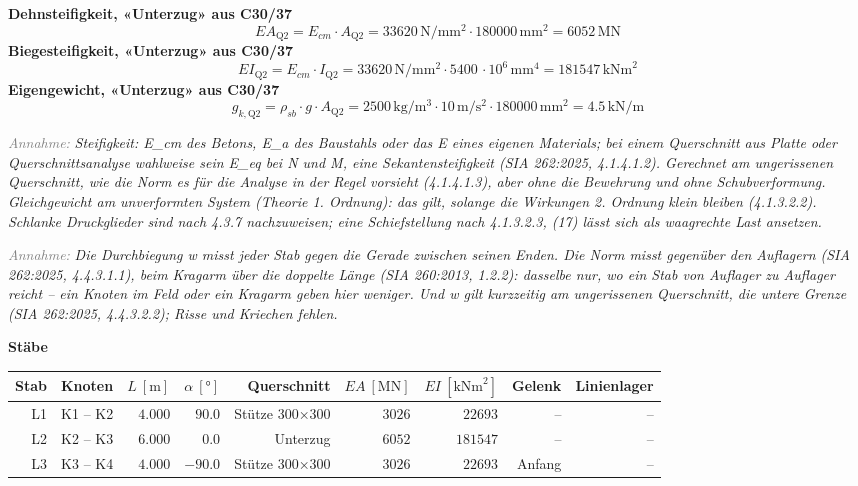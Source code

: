 \documentclass[11pt,a4paper]{article}
\newcommand{\hinweis}[2]{\par\noindent\textcolor{gray}{\textit{#1:}} \textit{#2}\par}
\begin{document}
\noindent\textbf{Dehnsteifigkeit, «Unterzug» aus C30/37}
\begin{equation*}
EA_{\text{Q2}} = E_{cm} \cdot A_{\text{Q2}} = 33620\,\mathrm{N}/\mathrm{mm}^{2} \cdot 180000\,\mathrm{mm}^{2} = 6052\,\mathrm{MN}
\end{equation*}
\noindent\textbf{Biegesteifigkeit, «Unterzug» aus C30/37}
\begin{equation*}
EI_{\text{Q2}} = E_{cm} \cdot I_{\text{Q2}} = 33620\,\mathrm{N}/\mathrm{mm}^{2} \cdot 5400\,\cdot 10^{6}\,\mathrm{mm}^{4} = 181547\,\mathrm{kNm}^{2}
\end{equation*}
\noindent\textbf{Eigengewicht, «Unterzug» aus C30/37}
\begin{equation*}
g_{k,\text{Q2}} = \rho_{sb} \cdot g \cdot A_{\text{Q2}} = 2500\,\mathrm{kg}/\mathrm{m}^{3} \cdot 10\,\mathrm{m}/\mathrm{s}^{2} \cdot 180000\,\mathrm{mm}^{2} = 4.5\,\mathrm{kN}/\mathrm{m}
\end{equation*}
\hinweis{Annahme}{Steifigkeit: E\_cm des Betons, E\_a des Baustahls oder das E eines eigenen Materials; bei einem Querschnitt aus Platte oder Querschnittsanalyse wahlweise sein E\_eq bei N und M, eine Sekantensteifigkeit (SIA 262:2025, 4.1.4.1.2). Gerechnet am ungerissenen Querschnitt, wie die Norm es für die Analyse in der Regel vorsieht (4.1.4.1.3), aber ohne die Bewehrung und ohne Schubverformung. Gleichgewicht am unverformten System (Theorie 1. Ordnung): das gilt, solange die Wirkungen 2. Ordnung klein bleiben (4.1.3.2.2). Schlanke Druckglieder sind nach 4.3.7 nachzuweisen; eine Schiefstellung nach 4.1.3.2.3, (17) lässt sich als waagrechte Last ansetzen.}
\hinweis{Annahme}{Die Durchbiegung w misst jeder Stab gegen die Gerade zwischen seinen Enden. Die Norm misst gegenüber den Auflagern (SIA 262:2025, 4.4.3.1.1), beim Kragarm über die doppelte Länge (SIA 260:2013, 1.2.2): dasselbe nur, wo ein Stab von Auflager zu Auflager reicht – ein Knoten im Feld oder ein Kragarm geben hier weniger. Und w gilt kurzzeitig am ungerissenen Querschnitt, die untere Grenze (SIA 262:2025, 4.4.3.2.2); Risse und Kriechen fehlen.}
\noindent\textbf{Stäbe}
\begin{longtable}{rrrrrrrrr}
\hline
Stab & Knoten & $L\ [\mathrm{m}]$ & $\alpha\ [°]$ & Querschnitt & $EA\ [\mathrm{MN}]$ & $EI\ [\mathrm{kNm}^{2}]$ & Gelenk & Linienlager \\
\hline
\endhead
L1 & K1 – K2 & $4.000$ & $90.0$ & Stütze 300×300 & $3026$ & $22693$ & – & – \\
L2 & K2 – K3 & $6.000$ & $0.0$ & Unterzug & $6052$ & $181547$ & – & – \\
L3 & K3 – K4 & $4.000$ & $-90.0$ & Stütze 300×300 & $3026$ & $22693$ & Anfang & – \\
\hline
\end{longtable}
\end{document}
